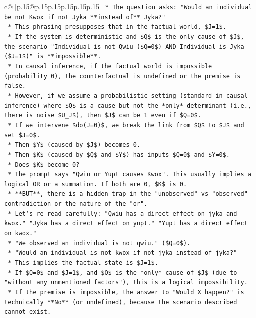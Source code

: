 \documentclass{article}
\begin{document}
{\begin{supertabular}{c@{$\;$}|p{.15\linewidth}@{}p{.15\linewidth}p{.15\linewidth}p{.15\linewidth}p{.15\linewidth}p{.15\linewidth}}
{{{\texttt{    *   The question asks: "Would an individual be not Kwox if not Jyka **instead of** Jyka?"} \\
\texttt{    *   This phrasing presupposes that in the factual world, \$J=1\$.} \\
\texttt{    *   If the system is deterministic and \$Q\$ is the only cause of \$J\$, the scenario "Individual is not Qwiu (\$Q=0\$) AND Individual is Jyka (\$J=1\$)" is **impossible**.} \\
\texttt{    *   In causal inference, if the factual world is impossible (probability 0), the counterfactual is undefined or the premise is false.} \\
\texttt{    *   However, if we assume a probabilistic setting (standard in causal inference) where \$Q\$ is a cause but not the *only* determinant (i.e., there is noise \$U\_J\$), then \$J\$ can be 1 even if \$Q=0\$.} \\
\texttt{    *   If we intervene \$do(J=0)\$, we break the link from \$Q\$ to \$J\$ and set \$J=0\$.} \\
\texttt{    *   Then \$Y\$ (caused by \$J\$) becomes 0.} \\
\texttt{    *   Then \$K\$ (caused by \$Q\$ and \$Y\$) has inputs \$Q=0\$ and \$Y=0\$.} \\
\texttt{    *   Does \$K\$ become 0?} \\
\texttt{    *   The prompt says "Qwiu or Yupt causes Kwox". This usually implies a logical OR or a summation. If both are 0, \$K\$ is 0.} \\
\texttt{    *   **BUT**, there is a hidden trap in the "unobserved" vs "observed" contradiction or the nature of the "or".} \\
\texttt{    *   Let's re{-}read carefully: "Qwiu has a direct effect on jyka and kwox." "Jyka has a direct effect on yupt." "Yupt has a direct effect on kwox."} \\
\texttt{    *   "We observed an individual is not qwiu." (\$Q=0\$).} \\
\texttt{    *   "Would an individual is not kwox if not jyka instead of jyka?"} \\
\texttt{    *   This implies the factual state is \$J=1\$.} \\
\texttt{    *   If \$Q=0\$ and \$J=1\$, and \$Q\$ is the *only* cause of \$J\$ (due to "without any unmentioned factors"), this is a logical impossibility.} \\
\texttt{    *   If the premise is impossible, the answer to "Would X happen?" is technically **No** (or undefined), because the scenario described cannot exist.} \\
}}}
\end{supertabular}}
\end{document}
